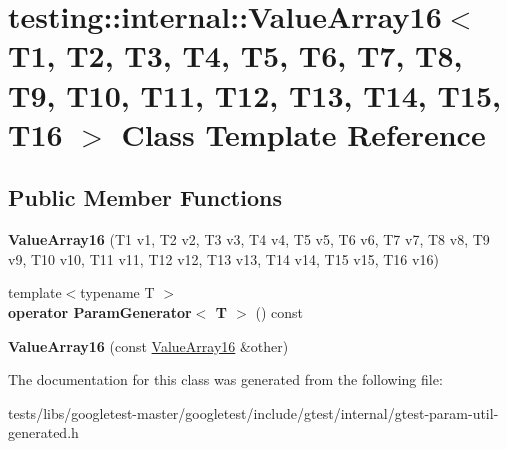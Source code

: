 \hypertarget{classtesting_1_1internal_1_1ValueArray16}{}\section{testing\+:\+:internal\+:\+:Value\+Array16$<$ T1, T2, T3, T4, T5, T6, T7, T8, T9, T10, T11, T12, T13, T14, T15, T16 $>$ Class Template Reference}
\label{classtesting_1_1internal_1_1ValueArray16}
\subsection*{Public Member Functions}
\begin{DoxyCompactItemize}
\item 
\mbox{\label{classtesting_1_1internal_1_1ValueArray16_ac12b3a15ab5418665a97b4a225438529}} 
{\bfseries Value\+Array16} (T1 v1, T2 v2, T3 v3, T4 v4, T5 v5, T6 v6, T7 v7, T8 v8, T9 v9, T10 v10, T11 v11, T12 v12, T13 v13, T14 v14, T15 v15, T16 v16)
\item 
\mbox{\label{classtesting_1_1internal_1_1ValueArray16_ae4f1174da079ca0d674497f5e452274c}} 
{\footnotesize template$<$typename T $>$ }\\{\bfseries operator Param\+Generator$<$ T $>$} () const
\item 
\mbox{\label{classtesting_1_1internal_1_1ValueArray16_a867f767c90905de55a8b4933881d144b}} 
{\bfseries Value\+Array16} (const \hyperlink{classtesting_1_1internal_1_1ValueArray16}{Value\+Array16} \&other)
\end{DoxyCompactItemize}


The documentation for this class was generated from the following file\+:\begin{DoxyCompactItemize}
\item 
tests/libs/googletest-\/master/googletest/include/gtest/internal/gtest-\/param-\/util-\/generated.\+h\end{DoxyCompactItemize}
